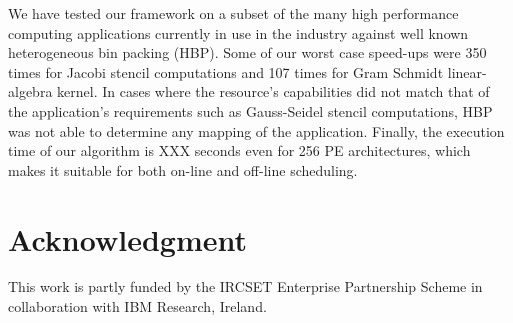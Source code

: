 \documentclass[10pt, conference, compsocconf]{IEEEtran}
\begin{document}
We have tested our framework on a subset of the many high performance
computing applications currently in use in the industry against well
known heterogeneous bin packing (HBP). Some of our worst case speed-ups
were 350 times for Jacobi stencil computations and 107 times for Gram
Schmidt linear-algebra kernel. In cases where the resource's
capabilities did not match that of the application's requirements such
as Gauss-Seidel stencil computations, HBP was not able to determine any
mapping of the application. Finally, the execution time of our algorithm
is XXX seconds even for 256 PE architectures, which makes it suitable
for both on-line and off-line scheduling.



\section{Acknowledgment}
This work is partly funded by the IRCSET Enterprise Partnership Scheme
in collaboration with IBM Research, Ireland.






%
%
%


\scriptsize{

% 

}

\end{document}

